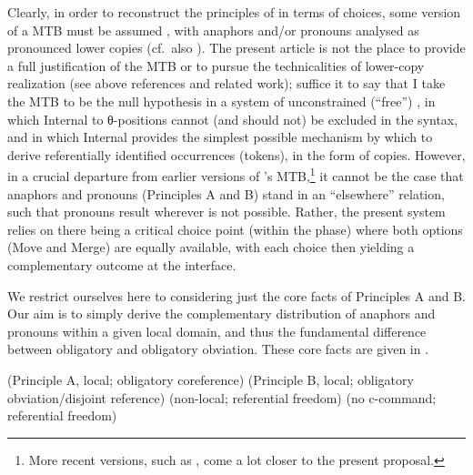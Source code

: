 \documentclass[output=paper]{langsci/langscibook}
\begin{document}
Clearly, in order to reconstruct the principles of  in terms of 
choices, some version of a \gls{MTB} must be assumed
\parencite{Hornstein2001,Hornstein2009,Hornstein2013,Kayne2002,Abe2014}, with
anaphors and/or pronouns analysed as pronounced lower copies (cf.\ also
\citealt{Heinat2003}).  The present article is not the place to provide a full
justification of the \gls{MTB} or to pursue the technicalities of lower-copy
realization (see above references and related work); suffice it to say that I
take the \gls{MTB} to be the null hypothesis in a system of unconstrained
(\enquote{free}) , in which Internal  to θ-positions cannot
(and should not) be excluded in the syntax, and in which Internal 
provides the simplest possible mechanism by which to derive referentially
identified occurrences (tokens), in the form of copies. However, in a crucial
departure from earlier versions of \citeauthor{Hornstein2001}’s
\gls{MTB},\footnote{More recent versions, such as \textcite{Hornstein2013},
    come a lot closer to the present proposal.} it cannot be the case that
    anaphors and pronouns (Principles A and B) stand in an \enquote{elsewhere}
    relation, such that pronouns result wherever
     is not possible.  Rather, the present system relies on there being
    a critical choice point (within the phase) where both options (Move and
    Merge) are equally available, with each choice then yielding a
    complementary outcome at the interface.

We restrict ourselves here to considering just the core facts of
Principles A and B. Our aim is to simply derive the complementary
distribution of anaphors and pronouns within a given local domain, and thus the
fundamental difference between obligatory  and obligatory
obviation. These core facts are given in .

\ea\label{ex:key:22.9}
    \ea\label{ex:key:22.9a} %
        \phantom{He thinks that Mary likes him\qquad}%
        (Principle A, local; obligatory \hphantom{He thinks that Mary likes
        him\qquad} coreference)
    \ex\label{ex:key:22.9b} %
        \phantom{He thinks that Mary likes him\qquad}%
        (Principle B, local; obligatory \hphantom{He thinks that Mary likes
        him\qquad} obviation/disjoint reference)
    \ex\label{ex:key:22.9c} %
        \phantom{He thinks that Mary likes him\qquad}%
        (non-local; referential freedom)
    \ex\label{ex:key:22.9d} %
        \phantom{He thinks that Mary likes him\qquad}%
        (no c-command; referential \hphantom{He thinks that Mary likes
        him\qquad} freedom)
    \z
\z
\end{document}

